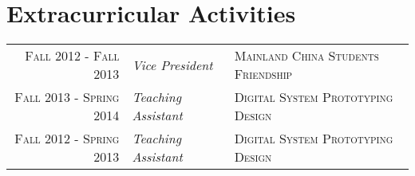 \documentclass[a4paper,10pt]{article}
\begin{document}
\section{Extracurricular Activities}
\begin{tabular}{rll}

\textsc{Fall 2012 - Fall 2013} & \emph{Vice President} & \textsc{Mainland China Students Friendship}\\

\textsc{Fall 2013 - Spring 2014} & \emph{Teaching Assistant} &\textsc{Digital System Prototyping Design}\\

\textsc{Fall 2012 - Spring 2013} & \emph{Teaching Assistant} &\textsc{Digital System Prototyping Design}\\

\end{tabular}
\end{document}
